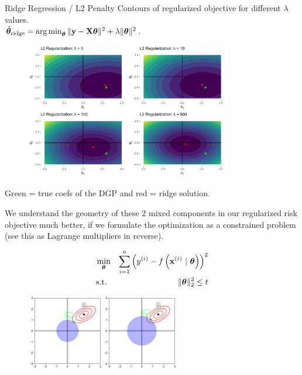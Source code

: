 \documentclass[11pt,compress,t,notes=noshow, xcolor=table]{beamer}
\begin{document}
\begin{vbframe}{Ridge Regression / L2 Penalty}
\framebreak 
Contours of regularized objective for different $\lambda$ values.\\
$ \hat{\bm{\theta}}_{\text{ridge}} = \operatorname*{arg\,min}_{\bm{\theta}} \|\mathbf{y} - \mathbf{X} \bm{\theta}\|^2 + \lambda \|\bm{\theta}\|^2 $.

\begin{figure}
\includegraphics[width=0.8\textwidth]{figure/reg_contours_02.png}
\end{figure}
\vspace{-0.2cm}
Green  = true coefs of the DGP and red = ridge solution.

\framebreak

We understand the geometry of these 2 mixed components in our regularized risk objective much better, if we formulate the optimization as a constrained problem (see this as Lagrange multipliers in reverse).

\vspace{-0.5cm}

\begin{eqnarray*}
\min_{\bm{\theta}} && \sum\limits_{i=1}^n \left(y^{(i)} - f\left(\mathbf{x}^{(i)} ~|~ \bm{\theta}\right)\right)^2 \\
  \text{s.t. } && \|\bm{\theta}\|_2^2  \leq t \\
\end{eqnarray*}

\vspace{-1.0cm}

\begin{figure}
\includegraphics[width=0.6\textwidth]{figure/ridge_perspectives_03.png}
\end{figure}


\end{vbframe}
\end{document}
